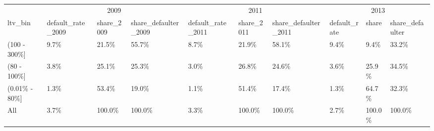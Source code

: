 \captionsetup[table]{labelformat=empty,skip=1pt}
\begin{longtable}{llllllllll}
\toprule
 & \multicolumn{3}{c}{2009} & \multicolumn{3}{c}{2011} & \multicolumn{3}{c}{2013} \\ 
 \cmidrule(lr){2-4} \cmidrule(lr){5-7} \cmidrule(lr){8-10}
ltv\_bin & default\_rate\_2009 & share\_2009 & share\_defaulter\_2009 & default\_rate\_2011 & share\_2011 & share\_defaulter\_2011 & default\_rate & share & share\_defaulter \\ 
\midrule
(100 - 300\%] & 9.7\% & 21.5\% & 55.7\% & 8.7\% & 21.9\% & 58.1\% & 9.4\% & 9.4\% & 33.2\% \\ 
(80 - 100\%] & 3.8\% & 25.1\% & 25.3\% & 3.0\% & 26.8\% & 24.6\% & 3.6\% & 25.9\% & 34.5\% \\ 
(0.01\% - 80\%] & 1.3\% & 53.4\% & 19.0\% & 1.1\% & 51.4\% & 17.4\% & 1.3\% & 64.7\% & 32.3\% \\ 
All & 3.7\% & 100.0\% & 100.0\% & 3.3\% & 100.0\% & 100.0\% & 2.7\% & 100.0\% & 100.0\% \\ 
\bottomrule
\end{longtable}
